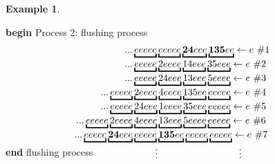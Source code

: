 \documentclass[submission]{FPSAC2021}
\theoremstyle{plain}
\theoremstyle{definition}
\newtheorem{example}[theorem]{Example}
\numberwithin{equation}{section}
\begin{document}
\begin{example}
\begin{multicols}{2}
            \columnbreak
            \begin{minipage}[H]{.45\textwidth+6pt}
            \begin{center}
            \textbf{begin} Process 2: flushing process
            \vspace{-1em}
\begin{align*}
    \hspace{-1.5em}...&\underbracket{eeeee}\underbracket{eeeee}\underbracket{\bm{24}eee}\underbracket{\bm{135}ee}\leftarrow e~\#1\\[-1mm]
    \hspace{-1.5em}...&\underbracket{eeeee}\underbracket{2eeee}\underbracket{14eee}\underbracket{35eee}\leftarrow e~\#2\\[-1mm]
    \hspace{-1.5em}...&\underbracket{eeeee}\underbracket{24eee}\underbracket{13eee}\underbracket{5eeee}\leftarrow e~\#3\\[-1mm]
    \hspace{-1.5em}...\underbracket{eeeee}&\underbracket{2eeee}\underbracket{4eeee}\underbracket{135ee}\underbracket{eeeee}\leftarrow e~\#4\\[-1mm]
    \hspace{-1.5em}...\underbracket{eeeee}&\underbracket{24eee}\underbracket{1eeee}\underbracket{35eee}\underbracket{eeeee}\leftarrow e~\#5\\[-1mm]
    \hspace{-1.5em}...\underbracket{eeeee}\underbracket{2eeee}&\underbracket{4eeee}\underbracket{13eee}\underbracket{5eeee}\underbracket{eeeee}\leftarrow e~\#6\\[-1mm]
    \hspace{-1.5em}...\underbracket{eeeee}\underbracket{\bm{24}eee}&\underbracket{eeeee}\underbracket{\bm{135}ee}\underbracket{eeeee}\underbracket{eeeee}\leftarrow e~\#7\\[-1mm]
    &\phantom{\underbracket{eeeee}}\vdots\phantom{\underbracket{2eeee}\underbracket{4eeee}\underbracket{4eeee}}~~~\vdots\\[-2.5em]
\end{align*}
            \textbf{end} flushing process
            \end{center}
\end{minipage}
\end{multicols}
\end{example}
\end{document}

